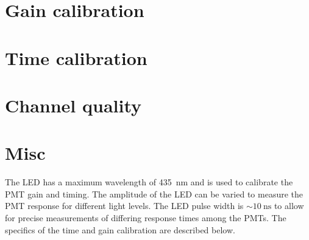 \section{Gain calibration}
\label{sec:gain}

\section{Time calibration}
\label{sec:time_calib}

\section{Channel quality}
\label{sec:channel_quality}

\section{Misc}

The LED has a maximum wavelength of \SI{435}{\nm}
and is used to calibrate the PMT gain and timing.
The amplitude of the LED can be varied to measure the PMT response
for different light levels.
The LED pulse width is $\sim\SI{10}{\ns}$ to allow for
precise measurements of differing response times among the PMTs.
The specifics of the time and gain calibration are described below.

